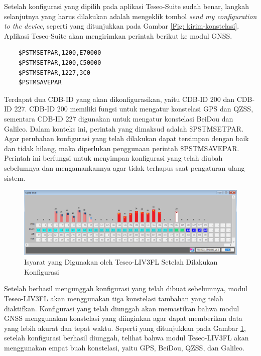 Setelah konfigurasi yang dipilih pada aplikasi Teseo-Suite sudah benar, langkah selanjutnya yang harus dilakukan adalah mengeklik tombol \textit{send my configuration to the device}, seperti yang ditunjukkan pada Gambar \ref{Fig: kirim-konstelasi}. Aplikasi Teseo-Suite akan mengirimkan perintah berikut ke modul GNSS.

\begin{verbatim}
	$PSTMSETPAR,1200,E70000
	$PSTMSETPAR,1200,C50000
	$PSTMSETPAR,1227,3C0
	$PSTMSAVEPAR
\end{verbatim}

Terdapat dua CDB-ID yang akan dikonfigurasikan, yaitu CDB-ID 200 dan CDB-ID 227. CDB-ID 200 memiliki fungsi untuk mengatur konstelasi GPS dan QZSS, sementara CDB-ID 227 digunakan untuk mengatur konstelasi BeiDou dan Galileo. Dalam konteks ini, perintah yang dimaksud adalah \$PSTMSETPAR. Agar perubahan konfigurasi yang telah dilakukan dapat tersimpan dengan baik dan tidak hilang, maka diperlukan penggunaan perintah \$PSTMSAVEPAR. Perintah ini berfungsi untuk menyimpan konfigurasi yang telah diubah sebelumnya dan mengamankannya agar tidak terhapus saat pengaturan ulang sistem. 

\begin{figure}[H]
	\centering
	\includegraphics[width=14cm]{contents/chapter-3/setting-konstelasi/setelah-konfigurasi.png}
	\caption{Isyarat yang Digunakan oleh Teseo\hyp{}LIV3FL Setelah Dilakukan Konfigurasi}
	\label{Fig: setelah-konfigurasi}
\end{figure}

Setelah berhasil mengunggah konfigurasi yang telah dibuat sebelumnya, modul Teseo\hyp{}LIV3FL akan menggunakan tiga konstelasi tambahan yang telah diaktifkan. Konfigurasi yang telah diunggah akan memastikan bahwa modul GNSS menggunakan konstelasi yang diinginkan agar dapat memberikan data yang lebih akurat dan tepat waktu. Seperti yang ditunjukkan pada Gambar \ref{Fig: setelah-konfigurasi}, setelah konfigurasi berhasil diunggah, telihat bahwa modul Teseo\hyp{}LIV3FL akan menggunakan empat buah konstelasi, yaitu GPS, BeiDou, QZSS, dan Galileo. 

